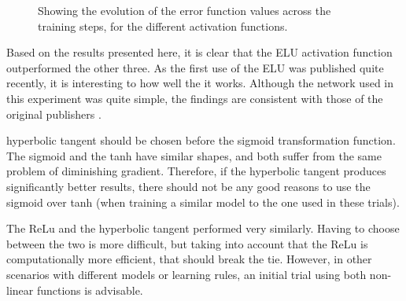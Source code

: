 \documentclass[]{article}
\begin{document}
\begin{figure}[h]
	\centering
	
	\caption{Showing the evolution of the error function values across the training steps, for the different activation functions.}
	\label{res-activ}
\end{figure}

Based on the results presented here, it is clear that the ELU activation function outperformed the other three. As the first use of the ELU was published quite recently, it is interesting to how well the it works. Although the network used in this experiment was quite simple, the findings are consistent with those of the original publishers \cite{elu}. 



 hyperbolic tangent should be chosen before the sigmoid transformation function. The sigmoid and the tanh have similar shapes, and both suffer from the same problem of diminishing gradient. Therefore, if the hyperbolic tangent produces significantly better results, there should not be any good reasons to use the sigmoid over tanh (when training a similar model to the one used in these trials).

The ReLu and the hyperbolic tangent performed very similarly. Having to choose between the two is more difficult, but taking into account that the ReLu is computationally more efficient, that should break the tie. However, in other scenarios with different models or learning rules, an initial trial using both non-linear functions is advisable.
\end{document}
